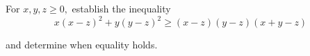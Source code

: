 For $ x,y,z \geq 0,$ establish the inequality\[ x(x-z)^2 + y(y-z)^2 \geq (x-z)(y-z)(x+y-z)\]

and determine when equality holds.